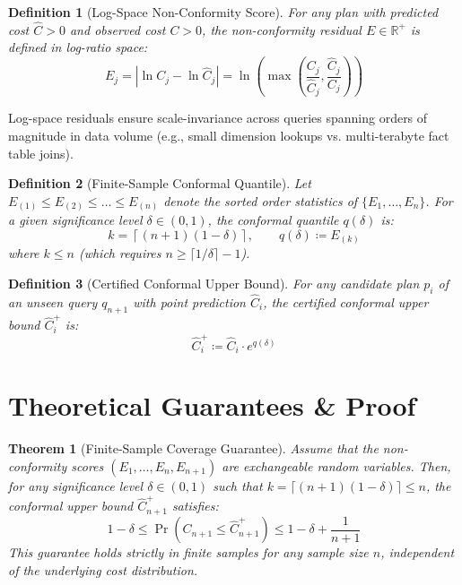 \documentclass[11pt,a4paper]{article}
\newtheorem{theorem}{Theorem}
\newtheorem{definition}{Definition}
\begin{document}
\begin{definition}[Log-Space Non-Conformity Score]
For any plan with predicted cost $\hat{C} > 0$ and observed cost $C > 0$, the non-conformity residual $E \in \mathbb{R}^+$ is defined in log-ratio space:
\begin{equation}
    E_j = \left| \ln C_j - \ln \hat{C}_j \right| = \ln \left( \max\left( \frac{C_j}{\hat{C}_j}, \frac{\hat{C}_j}{C_j} \right) \right)
\end{equation}
\end{definition}

Log-space residuals ensure scale-invariance across queries spanning orders of magnitude in data volume (e.g., small dimension lookups vs. multi-terabyte fact table joins).

\begin{definition}[Finite-Sample Conformal Quantile]
Let $E_{(1)} \le E_{(2)} \le \dots \le E_{(n)}$ denote the sorted order statistics of $\{E_1, \dots, E_n\}$. For a given significance level $\delta \in (0, 1)$, the conformal quantile $q(\delta)$ is:
\begin{equation}
    k = \left\lceil (n + 1)(1 - \delta) \right\rceil, \qquad q(\delta) \coloneqq E_{(k)}
\end{equation}
where $k \le n$ (which requires $n \ge \lceil 1/\delta \rceil - 1$).
\end{definition}

\begin{definition}[Certified Conformal Upper Bound]
For any candidate plan $p_i$ of an unseen query $q_{n+1}$ with point prediction $\hat{C}_i$, the certified conformal upper bound $\hat{C}_i^+$ is:
\begin{equation}
    \hat{C}_i^+ \coloneqq \hat{C}_i \cdot e^{q(\delta)}
\end{equation}
\end{definition}

\section{Theoretical Guarantees \& Proof}

\begin{theorem}[Finite-Sample Coverage Guarantee]
\label{thm:coverage}
Assume that the non-conformity scores $(E_1, \dots, E_n, E_{n+1})$ are exchangeable random variables. Then, for any significance level $\delta \in (0, 1)$ such that $k = \lceil(n+1)(1-\delta)\rceil \le n$, the conformal upper bound $\hat{C}_{n+1}^+$ satisfies:
\begin{equation}
    1 - \delta \le \Pr\left( C_{n+1} \le \hat{C}_{n+1}^+ \right) \le 1 - \delta + \frac{1}{n+1}
\end{equation}
This guarantee holds strictly in finite samples for any sample size $n$, independent of the underlying cost distribution.
\end{theorem}
\end{document}
